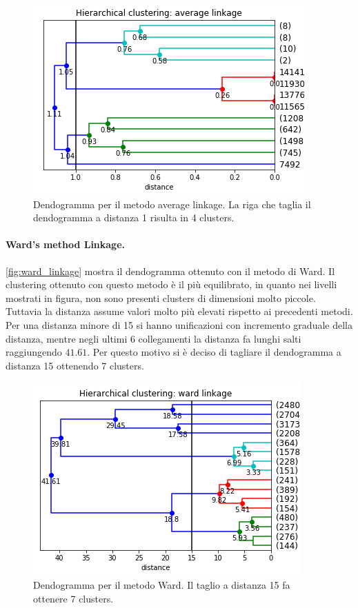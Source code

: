 \documentclass[a4paper]{article}
\begin{document}
\begin{figure}[hbtp]
\centering
\includegraphics[width=0.6\columnwidth]{../images/hierarchical_clustering_average-annotated.png}
\caption{Dendogramma per il metodo average linkage. La riga che taglia il dendogramma a distanza 1 risulta in 4 clusters.}
\label{fig:average_linkage}
\end{figure}

\paragraph{Ward's method Linkage.}
\autoref{fig:ward_linkage} mostra il dendogramma ottenuto con il metodo di Ward. Il clustering ottenuto con questo metodo è il più equilibrato, in quanto nei livelli mostrati in figura, non sono presenti clusters di dimensioni molto piccole. Tuttavia la distanza assume valori molto più elevati rispetto ai precedenti metodi. Per una distanza minore di 15 si hanno unificazioni con incremento graduale della distanza, mentre negli ultimi 6 collegamenti la distanza fa lunghi salti raggiungendo $41.61$. Per questo motivo si è deciso di tagliare il dendogramma a distanza 15 ottenendo 7 clusters. 

\begin{figure}[hbtp]
\centering
\includegraphics[width=0.6\columnwidth]{../images/hierarchical_clustering_ward-annotated.png}
\caption{Dendogramma per il metodo Ward. Il taglio a distanza 15 fa ottenere 7 clusters.}
\label{fig:ward_linkage}
\end{figure}
\end{document}
